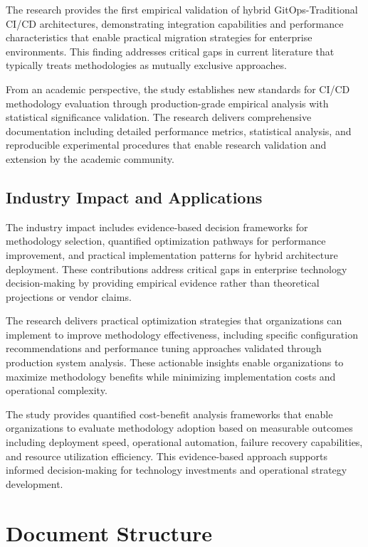 The research provides the first empirical validation of hybrid GitOps-Traditional CI/CD architectures, demonstrating integration capabilities and performance characteristics that enable practical migration strategies for enterprise environments. This finding addresses critical gaps in current literature that typically treats methodologies as mutually exclusive approaches.

From an academic perspective, the study establishes new standards for CI/CD methodology evaluation through production-grade empirical analysis with statistical significance validation. The research delivers comprehensive documentation including detailed performance metrics, statistical analysis, and reproducible experimental procedures that enable research validation and extension by the academic community.

\subsection{Industry Impact and Applications}
The industry impact includes evidence-based decision frameworks for methodology selection, quantified optimization pathways for performance improvement, and practical implementation patterns for hybrid architecture deployment. These contributions address critical gaps in enterprise technology decision-making by providing empirical evidence rather than theoretical projections or vendor claims.

The research delivers practical optimization strategies that organizations can implement to improve methodology effectiveness, including specific configuration recommendations and performance tuning approaches validated through production system analysis. These actionable insights enable organizations to maximize methodology benefits while minimizing implementation costs and operational complexity.

The study provides quantified cost-benefit analysis frameworks that enable organizations to evaluate methodology adoption based on measurable outcomes including deployment speed, operational automation, failure recovery capabilities, and resource utilization efficiency. This evidence-based approach supports informed decision-making for technology investments and operational strategy development.

\section{Document Structure}

